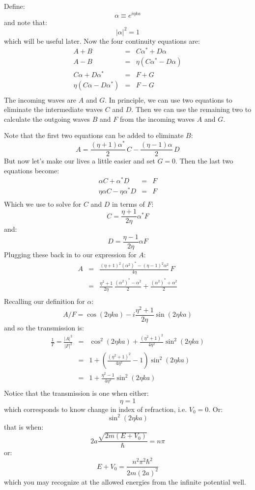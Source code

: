 \documentclass[12pt]{book}
\begin{document}
Define:
$$\alpha \equiv e^{i\eta ka}$$
and note that:
$$|\alpha|^2 = 1$$
which will be useful later.  Now the four continuity equations are:
\begin{eqnarray*}
A + B &=& C \alpha^* + D \alpha \\
A - B &=& \eta(C \alpha^* - D \alpha) \\
C \alpha + D \alpha^* &=& F + G  \\
\eta(C \alpha - D \alpha^*) &=& F - G \\
\end{eqnarray*}
The incoming waves are $A$ and $G$.  In principle, we can use two equations to eliminate the intermediate waves $C$ and $D$.  Then we can use the remaining two to calculate the outgoing waves $B$ and $F$ from the incoming waves $A$ and $G$. 

Note that the first two equations can be added to eliminate $B$:
$$A = \frac{(\eta+1) \alpha^*}{2} \, C - \frac{(\eta-1) \alpha}{2} \, D$$
But now let's make our lives a little easier and set $G=0$.  Then the last two equations become:
\begin{eqnarray*}
\alpha C  + \alpha^* D &=& F   \\
\eta \alpha C  - \eta \alpha^* D &=& F  \\
\end{eqnarray*}
Which we use to solve for $C$ and $D$ in terms of $F$:
$$C = \frac{\eta+1}{2\eta}\alpha^* F$$
and:
$$D = \frac{\eta-1}{2\eta}\alpha F$$
Plugging these back in to our expression for $A$:
\begin{eqnarray*}
A &=& \frac{(\eta+1)^2 (\alpha^2)^* - (\eta-1)^2 \alpha^2}{4 \eta} \, F \\
  &=& \frac{\eta^2+1}{2\eta}\,\frac{(\alpha^2)^*-\alpha^2}{2}+\frac{(\alpha^2)^*+\alpha^2}{2}\\
\end{eqnarray*}
Recalling our definition for $\alpha$:
$$A/F = \cos(2\eta ka) - i\frac{\eta^2+1}{2\eta} \sin(2\eta ka)$$
and so the transmission is:
\begin{eqnarray*}
\frac{1}{T} = \frac{|A|^2}{|F|^2} &=& \cos^2(2\eta ka) + \frac{(\eta^2+1)^2}{4\eta^2} \sin^2(2\eta ka) \\
&=& 1 + \left(\frac{(\eta^2+1)^2}{4\eta^2} - 1\right)\sin^2(2\eta ka) \\
&=& 1 + \frac{\eta^2-1}{4\eta^2}\sin^2(2\eta ka)\\
\end{eqnarray*}
Notice that the transmission is one when either:
$$\eta=1$$
which corresponds to know change in index of refraction, i.e. $V_0=0$.  Or:
$$\sin^2(2\eta ka) $$
that is when:
$$ 2a\frac{\sqrt{2m(E+V_0)}}{\hbar}= n \pi$$
or:
$$E+V_0 = \frac{n^2 \pi^2 \hbar^2}{2m (2a)^2}$$
which you may recognize at the allowed energies from the infinite potential well.
\end{document}
